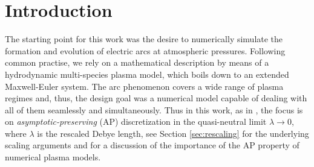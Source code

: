 \documentclass{article}
\newcommand{\mycomment}[1]{\noindent\textcolor{orange}{\underline{\textsf{\textbf{#1}}}}}
\begin{document}



\section{Introduction}

The starting point for this work was the desire to numerically simulate the formation and
evolution of electric arcs at atmospheric pressures. Following common practise, we rely on
a mathematical description by means of a hydrodynamic multi-species plasma model, which
boils down to an extended Maxwell-Euler system. The arc phenomenon covers a wide range of
plasma regimes and, thus, the design goal was a numerical model capable of dealing
with all of them seamlessly and simultaneously. Thus in this work, as in
\cite{degond_2012}, the focus is on \emph{asymptotic-preserving} (AP) discretization in
the quasi-neutral limit $\lambda \rightarrow 0$, where $\lambda$ is the rescaled Debye
length, see Section \ref{sec:rescaling} for the underlying scaling arguments and
\cite{degond_2012,degond_2017} for a discussion of the importance of the AP property of
numerical plasma models.
\end{document}
